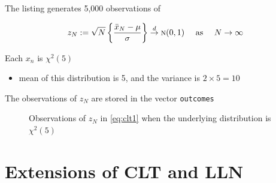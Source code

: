 \begin{frame}

    \vspace{2em}
    The listing generates 5,000 observations of
    
    \begin{equation*}
    z_N := \sqrt{N} \left\{ \frac{\bar x_N - \mu}{\sigma}  \right\}
    \stackrel { d } {\to} \textrm{\sc n}(0,1)
    \quad \text{ as } \quad
    N \to \infty
    \end{equation*}
    
    Each $x_n$ is $\chi^2(5)$
    \begin{itemize}
        \item mean of this distribution is 5, and the variance is $2
    \times 5 = 10$
    \end{itemize}
    
    \vspace{1em}
    The observations of $z_N$ are stored in the vector
    \texttt{outcomes}
    
\end{frame}

\begin{frame}

    \begin{figure}
       \begin{center}
        \caption{\label{f:illus_clt} Observations of $z_N$ in \eqref{eq:clt1} when the underlying distribution is $\chi^2(5)$}
       \end{center}
    \end{figure}

\end{frame}

\section{Extensions of CLT and LLN}

